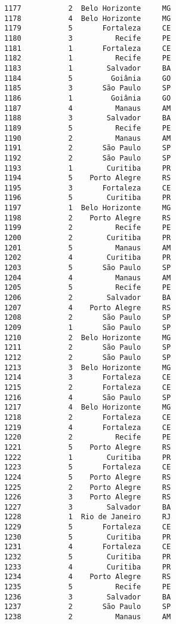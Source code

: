 \documentclass[11pt]{article}
\begin{document}
\begin{Verbatim}[commandchars=\\\{\}]
1177           2  Belo Horizonte     MG  
1178           4  Belo Horizonte     MG  
1179           5       Fortaleza     CE  
1180           3          Recife     PE  
1181           1       Fortaleza     CE  
1182           1          Recife     PE  
1183           1        Salvador     BA  
1184           5         Goiânia     GO  
1185           3       São Paulo     SP  
1186           1         Goiânia     GO  
1187           4          Manaus     AM  
1188           3        Salvador     BA  
1189           5          Recife     PE  
1190           2          Manaus     AM  
1191           2       São Paulo     SP  
1192           2       São Paulo     SP  
1193           1        Curitiba     PR  
1194           5    Porto Alegre     RS  
1195           3       Fortaleza     CE  
1196           5        Curitiba     PR  
1197           1  Belo Horizonte     MG  
1198           2    Porto Alegre     RS  
1199           2          Recife     PE  
1200           2        Curitiba     PR  
1201           5          Manaus     AM  
1202           4        Curitiba     PR  
1203           5       São Paulo     SP  
1204           4          Manaus     AM  
1205           5          Recife     PE  
1206           2        Salvador     BA  
1207           4    Porto Alegre     RS  
1208           2       São Paulo     SP  
1209           1       São Paulo     SP  
1210           2  Belo Horizonte     MG  
1211           2       São Paulo     SP  
1212           2       São Paulo     SP  
1213           3  Belo Horizonte     MG  
1214           3       Fortaleza     CE  
1215           2       Fortaleza     CE  
1216           4       São Paulo     SP  
1217           4  Belo Horizonte     MG  
1218           2       Fortaleza     CE  
1219           4       Fortaleza     CE  
1220           2          Recife     PE  
1221           5    Porto Alegre     RS  
1222           1        Curitiba     PR  
1223           5       Fortaleza     CE  
1224           5    Porto Alegre     RS  
1225           2    Porto Alegre     RS  
1226           3    Porto Alegre     RS  
1227           3        Salvador     BA  
1228           1  Rio de Janeiro     RJ  
1229           5       Fortaleza     CE  
1230           5        Curitiba     PR  
1231           4       Fortaleza     CE  
1232           5        Curitiba     PR  
1233           4        Curitiba     PR  
1234           4    Porto Alegre     RS  
1235           5          Recife     PE  
1236           3        Salvador     BA  
1237           2       São Paulo     SP  
1238           2          Manaus     AM  

\end{Verbatim}
\end{document}
